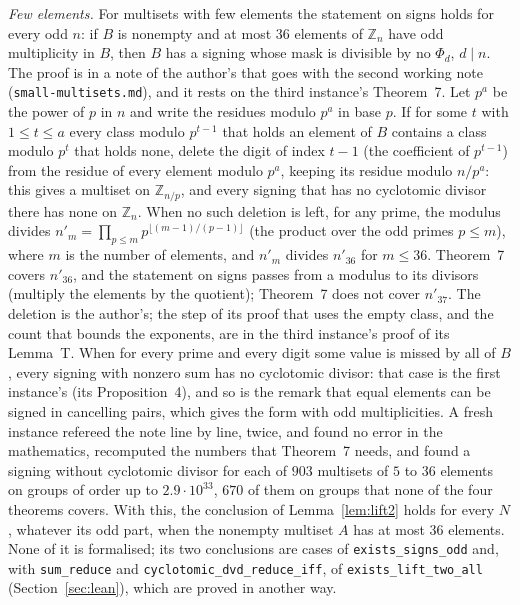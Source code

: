 \documentclass[11pt,a4paper]{amsart}
\theoremstyle{definition}
\theoremstyle{remark}
\newcommand{\Z}{\mathbb{Z}}
\newcommand{\lean}[1]{\texttt{#1}}
\begin{document}
\emph{Few elements.} For multisets with few elements the statement on signs holds for every odd $n$: if $B$ is
nonempty and at most $36$ elements of $\Z_n$ have odd multiplicity in $B$, then $B$ has a signing whose mask is divisible
by no $\Phi_d$, $d\mid n$. The proof is in a note of the author's that goes with the second working note
(\texttt{small-multisets.md}), and it rests on the third instance's Theorem~7. Let $p^a$ be the power of $p$ in $n$ and
write the residues modulo $p^a$ in base $p$. If for some $t$ with $1\le t\le a$ every class modulo $p^{t-1}$ that holds an
element of $B$ contains a class modulo $p^t$ that holds none, delete the digit of index $t-1$ (the coefficient of
$p^{t-1}$) from the residue of every element modulo $p^a$, keeping its residue modulo $n/p^a$: this gives a multiset on
$\Z_{n/p}$, and every signing that has no cyclotomic divisor there has none on $\Z_n$. When no such deletion is left,
for any prime, the modulus divides $n'_m=\prod_{p\le m}p^{\lfloor(m-1)/(p-1)\rfloor}$ (the product over the odd primes
$p\le m$), where $m$ is the number of elements, and $n'_m$ divides $n'_{36}$ for $m\le36$. Theorem~7 covers $n'_{36}$,
and the statement on signs passes from a modulus to its divisors (multiply the elements by the quotient); Theorem~7
does not cover $n'_{37}$. The deletion is the author's; the step of its proof that uses the empty class, and the count
that bounds the exponents, are in the third instance's proof of its Lemma~T. When for every prime and every digit some
value is missed by all of $B$, every signing with nonzero sum has no cyclotomic divisor: that case is the first
instance's (its Proposition~4), and so is the remark that equal elements can be signed in cancelling pairs, which gives
the form with odd multiplicities. A fresh instance refereed the note line by line, twice, and found no error in the
mathematics, recomputed the numbers that Theorem~7 needs, and found a signing without cyclotomic divisor for each of
$903$ multisets of $5$ to $36$ elements on groups of order up to $2.9\cdot10^{33}$, $670$ of them on groups that none of
the four theorems covers. With this, the conclusion of Lemma~\ref{lem:lift2} holds for every $N$, whatever its odd part,
when the nonempty multiset $A$ has at most $36$ elements. None of it is formalised; its two conclusions are cases
of \lean{exists\_signs\_odd} and, with \lean{sum\_reduce} and \lean{cyclotomic\_dvd\_reduce\_iff}, of
\lean{exists\_lift\_two\_all} (Section~\ref{sec:lean}), which are proved in another way.
\end{document}
